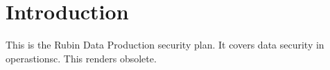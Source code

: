 \section{Introduction}
This is the Rubin Data Production security plan. It covers data security in operastionsc.
This renders  obsolete.
